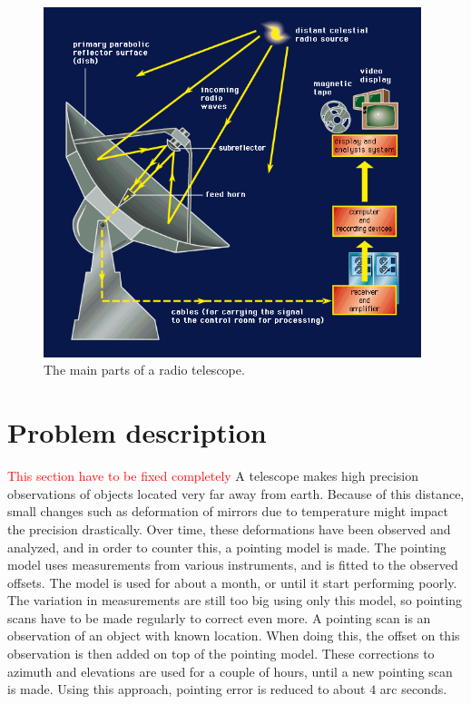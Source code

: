 \begin{figure}[H]
    \centering
    \includegraphics[width=0.98\textwidth]{Astronomy/radio_telescope.png}
    \caption{The main parts of a radio telescope.}
    \label{fig:radio_telescope}
\end{figure}


\section{Problem description}
\textcolor{red}{This section have to be fixed completely}
A telescope makes high precision observations of objects located very far away from earth.
Because of this distance, small changes such as deformation of mirrors due to temperature might impact the precision drastically.
Over time, these deformations have been observed and analyzed, and in order to counter this, a pointing model is made.
The pointing model uses measurements from various instruments, and is fitted to the observed offsets.
The model is used for about a month, or until it start performing poorly.
The variation in measurements are still too big using only this model, so pointing scans have to be made regularly to correct even more.
A pointing scan is an observation of an object with known location.
When doing this, the offset on this observation is then added on top of the pointing model.
These corrections to azimuth and elevations are used for a couple of hours, until a new pointing scan is made.
Using this approach, pointing error is reduced to about $4$ arc seconds.\\

